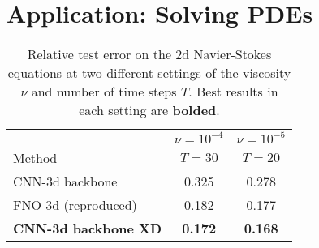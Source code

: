 
\section{Application: Solving PDEs}

\begin{table}[!t]
	\centering
	\begin{threeparttable}
		\begin{tabular}{lcc}
					\hline
					& $\nu=10^{-4}$ & $\nu=10^{-5}$ \\
					Method                     & $T=30$ & $T=20$  \\ 
					\hline
					CNN-3d backbone                 &    0.325    &  0.278    \\
					FNO-3d (reproduced)                           &   0.182     &  0.177   \\
					{\bf CNN-3d backbone XD}  &     {\bf 0.172}  &  {\bf 0.168}     \\
					\hline
				\end{tabular}
		\caption{\label{tab:navierstokes}
			Relative test error on the 2d Navier-Stokes equations at two different settings of the viscosity $\nu$ and number of time steps $T$. 
			Best results in each setting are {\bf bolded}.
		}
	\end{threeparttable}
\end{table}

